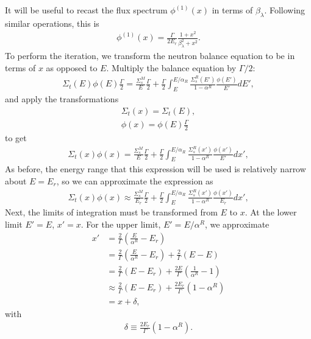 It will be useful to recast the flux spectrum $\phi^{(1)}(x)$ in terms of $\beta_\lambda$. Following similar operations, this is
\begin{align}
  \phi^{(1)}(x) = \frac{\Gamma}{2E_r} \frac{ 1 + x^2 }{ \beta_\lambda^2 + x^2 } .
\end{align}
To perform the iteration, we transform the neutron balance equation to be in terms of $x$ as opposed to $E$. Multiply the balance equation by $\Gamma/2$:
\begin{align}
  \Sigma_t(E) \phi(E) \frac{\Gamma}{2} = \frac{\Sigma_s^M}{E} \frac{\Gamma}{2}
  + \frac{\Gamma}{2} \int_E^{E/\alpha_R} \frac{\Sigma_s^R(E')}{1-\alpha^R} \frac{\phi(E')}{E'} dE',
\end{align}
and apply the transformations
\begin{align}
  \Sigma_t(x) = \Sigma_t(E), \nonumber \\
  \phi(x) = \phi(E) \frac{\Gamma}{2} 
\end{align}
to get
\begin{align}
  \Sigma_t(x) \phi(x)  = \frac{\Sigma_s^M}{E} \frac{\Gamma}{2}
  + \frac{\Gamma}{2} \int_E^{E/\alpha_R} \frac{\Sigma_s^R(x')}{1-\alpha^R} \frac{\phi(x')}{E'} dx',
\end{align}
As before, the energy range that this expression will be used is relatively narrow about $E = E_r$, so we can approximate the expression as
\begin{align}
  \Sigma_t(x) \phi(x)  \approx \frac{\Sigma_s^M}{E_r} \frac{\Gamma}{2}
  + \frac{\Gamma}{2} \int_E^{E/\alpha_R} \frac{\Sigma_s^R(x')}{1-\alpha^R} \frac{\phi(x')}{E_r} dx',
\end{align}
Next, the limits of integration must be transformed from $E$ to $x$. At the lower limit $E' = E$, $x' = x$. For the upper limit, $E' = E/\alpha^R$, we approximate
\begin{align}
  x' &= \frac{2}{\Gamma} \left( \frac{E}{\alpha^R} - E_r \right) \nonumber \\
     &= \frac{2}{\Gamma} \left( \frac{E}{\alpha^R} - E_r \right) + \frac{2}{\Gamma} ( E - E ) \nonumber \\
     &= \frac{2}{\Gamma} ( E - E_r ) + \frac{2E}{\Gamma} \left( \frac{1}{\alpha^R} - 1 \right) \nonumber \\
     &\approx \frac{2}{\Gamma} ( E - E_r ) + \frac{2E_r}{\Gamma} \left( 1 - \alpha^R \right) \nonumber \\
     &= x + \delta,
\end{align}
with
\begin{align} \label{Eq:thermalization_IRdelta}
  \delta \equiv \frac{2E_r}{\Gamma} \left( 1 - \alpha^R \right) .
\end{align}
